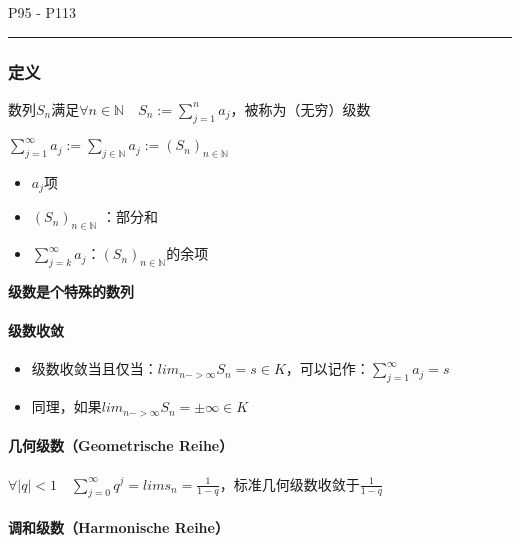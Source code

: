 \documentclass[a4paper,12pt]{article}
\providecommand{\tightlist}{\setlength{\itemsep}{0pt}\setlength{\parskip}{0pt}}
\begin{document}
\thispagestyle{fancy}




P95 - P113

\begin{center}\rule{0.5\linewidth}{0.5pt}\end{center}

\subsubsection{定义}\label{ux5b9aux4e49}

数列\(S_n\)满足\(\forall n \in \mathbb{N} \quad S_n := \sum_{j=1}^n a_j\)，被称为（无穷）级数

\(\sum_{j=1}^\infty a_j:= \sum_{j \in \mathbb{N}}a_j := (S_n)_{n \in \mathbb{N}}\)

\begin{itemize}
\tightlist
\item
  \(a_j\)项
\item
  \((S_n)_{n \in \mathbb{N}}\) ：部分和
\item
  \(\sum_{j  = k}^\infty a_j\)：\((S_n)_{n \in \mathbb{N}}\)的余项
\end{itemize}

\textbf{级数是个特殊的数列}

\paragraph{级数收敛}\label{ux7ea7ux6570ux6536ux655b}

\begin{itemize}
\tightlist
\item
  级数收敛当且仅当：\(lim_{n->\infty}S_n = s \in K\)，可以记作：\(\sum_{j = 1}^\infty a_j = s\)
\item
  同理，如果\(lim_{n->\infty}S_n = \pm\infty \in K\)
\end{itemize}

\paragraph{几何级数（Geometrische
Reihe）}\label{ux51e0ux4f55ux7ea7ux6570geometrische-reihe}

\(\forall |q| < 1\quad\sum_{j = 0}^\infty q^j = lim s_n = \frac{1}{1-q}\)，标准几何级数收敛于\(\frac{1}{1-q}\)

\paragraph{调和级数（Harmonische
Reihe）}\label{ux8c03ux548cux7ea7ux6570harmonische-reihe}
\end{document}
